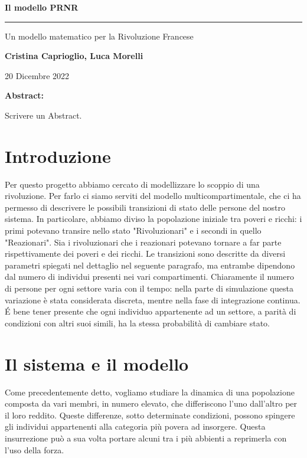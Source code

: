 \begin{center}
	\huge \textbf{Il modello PRNR}
	
	\rule{7cm}{0.4pt} 
	
	\LARGE Un modello matematico per la Rivoluzione Francese
	
	\vspace{20pt}
	
	\LARGE \textbf{Cristina Caprioglio, Luca Morelli}
	
	\vspace{5pt}
	
	\LARGE 20 Dicembre 2022
	
	\vspace{20pt}
 
	\normalsize\textbf{Abstract:}\\
\end{center}
Scrivere un Abstract.

\vspace{20pt}

\section*{Introduzione}
Per questo progetto abbiamo cercato di modellizzare lo scoppio di una rivoluzione. Per farlo ci siamo serviti del modello multicompartimentale, che ci ha permesso di descrivere le possibili transizioni di stato delle persone del nostro sistema. In particolare, abbiamo diviso la popolazione iniziale tra poveri e ricchi: i primi potevano transire nello stato "Rivoluzionari" e i secondi in quello "Reazionari". Sia i rivoluzionari che i reazionari potevano tornare a far parte rispettivamente dei poveri e dei ricchi. Le transizioni sono descritte da diversi parametri spiegati nel dettaglio nel seguente paragrafo, ma entrambe dipendono dal numero di individui presenti nei vari compartimenti. Chiaramente il numero di persone per ogni settore varia con il tempo: nella parte di simulazione questa variazione è stata considerata discreta, mentre nella fase di integrazione continua. 
É bene tener presente che ogni individuo appartenente ad un settore, a parità di condizioni con altri suoi simili, ha la stessa probabilità di cambiare stato.
\section{Il sistema e il modello}
Come precedentemente detto, vogliamo studiare la dinamica di una popolazione composta da vari membri, in numero elevato, che differiscono l'uno dall'altro per il loro reddito. Queste differenze, sotto determinate condizioni, possono spingere gli individui appartenenti alla categoria più povera ad insorgere. Questa insurrezione può a sua volta portare alcuni tra i più abbienti a reprimerla con l'uso della forza.\\

